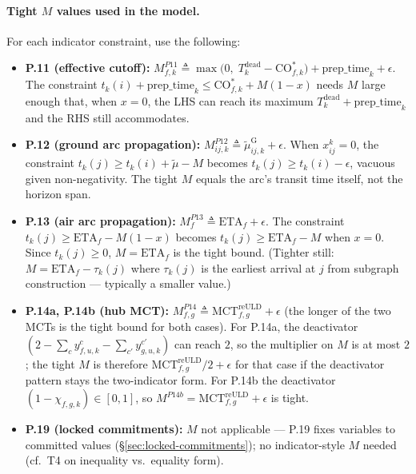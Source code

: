 \documentclass[11pt,a4paper]{article}
\newcommand{\defeq}{\triangleq}
\theoremstyle{definition}
\begin{document}
\paragraph{Tight $M$ values used in the model.}
For each indicator constraint, use the following:
\begin{itemize}[noitemsep]
  \item \textbf{P.11 (effective cutoff):}
        $M^{P11}_{f,k} \defeq \max\!\bigl(0,\; T_k^{\text{dead}} - \text{CO}^*_{f,k}\bigr) + \text{prep\_time}_k + \epsilon$.
        The constraint $t_k(i) + \text{prep\_time}_k \leq \text{CO}^*_{f,k} + M(1 - x)$
        needs $M$ large enough that, when $x = 0$, the LHS can reach its maximum
        $T_k^{\text{dead}} + \text{prep\_time}_k$ and the RHS still accommodates.
  \item \textbf{P.12 (ground arc propagation):}
        $M^{P12}_{ij,k} \defeq \tilde{\mu}^{\text{G}}_{ij,k} + \epsilon$.
        When $x_{ij}^k = 0$, the constraint $t_k(j) \geq t_k(i) + \tilde{\mu} - M$
        becomes $t_k(j) \geq t_k(i) - \epsilon$, vacuous given non-negativity. The
        tight $M$ equals the arc's transit time itself, not the horizon span.
  \item \textbf{P.13 (air arc propagation):}
        $M^{P13}_f \defeq \text{ETA}_f + \epsilon$.
        The constraint $t_k(j) \geq \text{ETA}_f - M(1 - x)$ becomes
        $t_k(j) \geq \text{ETA}_f - M$ when $x = 0$. Since
        $t_k(j) \geq 0$, $M = \text{ETA}_f$ is the tight bound.
        (Tighter still: $M = \text{ETA}_f - \tau_k(j)$ where $\tau_k(j)$ is the
        earliest arrival at $j$ from subgraph construction --- typically a
        smaller value.)
  \item \textbf{P.14a, P.14b (hub MCT):}
        $M^{P14}_{f,g} \defeq \text{MCT}^{\text{reULD}}_{f,g} + \epsilon$ (the longer
        of the two MCTs is the tight bound for both cases). For P.14a, the
        deactivator $(2 - \sum_c y^c_{f,u,k} - \sum_{c'} y^{c'}_{g,u,k})$ can reach
        $2$, so the multiplier on $M$ is at most $2$; the tight $M$ is therefore
        $\text{MCT}^{\text{reULD}}_{f,g} / 2 + \epsilon$ for that case if the
        deactivator pattern stays the two-indicator form. For P.14b the
        deactivator $(1 - \chi_{f,g,k}) \in [0, 1]$, so $M^{P14b} = \text{MCT}^{\text{reULD}}_{f,g} + \epsilon$
        is tight.
  \item \textbf{P.19 (locked commitments):}
        $M$ not applicable --- P.19 fixes variables to committed values
        (\S\ref{sec:locked-commitments}); no indicator-style $M$ needed (cf.\ T4
        on inequality vs.\ equality form).
\end{itemize}
\end{document}
